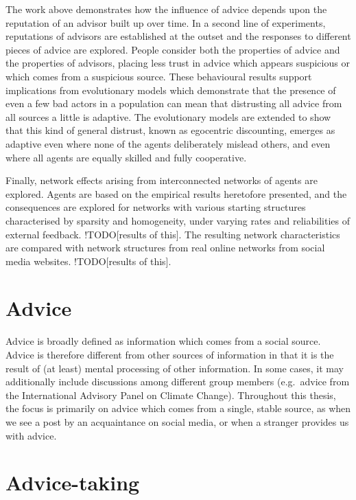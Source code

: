 \documentclass[a4paper, nobind]{templates/ociamthesis}
\begin{document}
The work above demonstrates how the influence of advice depends upon the reputation of an advisor built up over time. In a second line of experiments, reputations of advisors are established at the outset and the responses to different pieces of advice are explored. People consider both the properties of advice and the properties of advisors, placing less trust in advice which appears suspicious or which comes from a suspicious source. These behavioural results support implications from evolutionary models which demonstrate that the presence of even a few bad actors in a population can mean that distrusting all advice from all sources a little is adaptive. The evolutionary models are extended to show that this kind of general distrust, known as egocentric discounting, emerges as adaptive even where none of the agents deliberately mislead others, and even where all agents are equally skilled and fully cooperative.

Finally, network effects arising from interconnected networks of agents are explored. Agents are based on the empirical results heretofore presented, and the consequences are explored for networks with various starting structures characterised by sparsity and homogeneity, under varying rates and reliabilities of external feedback. !TODO{[}results of this{]}. The resulting network characteristics are compared with network structures from real online networks from social media websites. !TODO{[}results of this{]}.

\hypertarget{advice}{%
\section*{Advice}\label{advice}}

Advice is broadly defined as information which comes from a social source. Advice is therefore different from other sources of information in that it is the result of (at least) mental processing of other information. In some cases, it may additionally include discussions among different group members (e.g.~advice from the International Advisory Panel on Climate Change). Throughout this thesis, the focus is primarily on advice which comes from a single, stable source, as when we see a post by an acquaintance on social media, or when a stranger provides us with advice.

\hypertarget{advice-taking}{%
\section*{Advice-taking}\label{advice-taking}}
\end{document}
